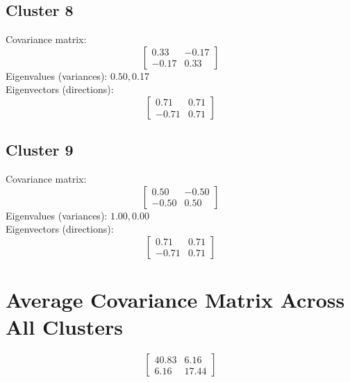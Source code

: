 \documentclass{article}
\begin{document}
\subsection*{Cluster 8}
Covariance matrix:
\[\begin{bmatrix}0.33 & -0.17 \\-0.17 & 0.33\end{bmatrix}\]
Eigenvalues (variances): $ 0.50, $0.17\\
Eigenvectors (directions):
\[\begin{bmatrix}0.71 & 0.71 \\-0.71 & 0.71\end{bmatrix}\]
\subsection*{Cluster 9}
Covariance matrix:
\[\begin{bmatrix}0.50 & -0.50 \\-0.50 & 0.50\end{bmatrix}\]
Eigenvalues (variances): $ 1.00, $0.00\\
Eigenvectors (directions):
\[\begin{bmatrix}0.71 & 0.71 \\-0.71 & 0.71\end{bmatrix}\]
\section*{Average Covariance Matrix Across All Clusters}
\[\begin{bmatrix}40.83 & 6.16 \\6.16 & 17.44\end{bmatrix}\]
\end{document}
